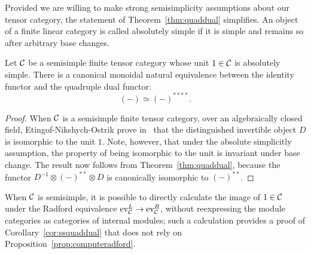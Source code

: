 \documentclass{amsart}
\begin{document}
Provided we are willing to make strong semisimplicity assumptions about our tensor category, the statement of Theorem~\ref{thm:quaddual} simplifies.  
An object of a finite linear category is called absolutely simple if it is simple and remains so after arbitrary base changes. \begin{corollary} \label{cor:ssquaddual}
Let $\mathcal C$ be a semisimple finite tensor category whose unit $1 \in \mathcal C$ is absolutely simple. There is a canonical monoidal natural equivalence between the identity functor and the quadruple dual functor:
\[
(-) \simeq (-)^{****}.
\]
\end{corollary} 
\begin{proof}
When $\mathcal C$ is a semisimple finite tensor category, over an algebraically closed field, Etingof-Nikshych-Ostrik prove in~\cite[Cor 6.4]{MR2097289} that the distinguished invertible object $D$ is isomorphic to the unit $1$.  Note, however, that under the absolute simplicitly assumption, the property of being isomorphic to the unit is invariant under base change.  The result now follows from Theorem~\ref{thm:quaddual}, because the functor $D^{-1} \otimes (-)^{**} \otimes D$ is canonically isomorphic to $(-)^{**}$.
\end{proof}   %

When $\mathcal C$ is semisimple, it is possible to directly calculate the image of $1 \in \mathcal C$ under the Radford equivalence $\mathrm{ev}_\mathcal C^L \rightarrow \mathrm{ev}_\mathcal C^R$, without reexpressing the module categories as categories of internal modules; such a calculation provides a proof of Corollary~\ref{cor:ssquaddual} that does not rely on Proposition~\ref{prop:computeradford}.
\end{document}
